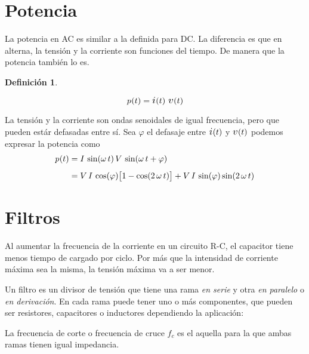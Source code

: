 \documentclass[a5paper,12pt,twoside]{book}
\newtheorem{defn}{{Definición}}[chapter]
\begin{document}
\section{Potencia}

La potencia en AC es similar a la definida para DC. La diferencia es que en alterna, la tensión y la corriente son funciones del tiempo. De manera que la potencia también lo es.

\begin{mdframed}[style=MyFrame1]
    \begin{defn}
    \end{defn}
    \begin{equation*}
        \fx{p}{t} = \fx{\current}{t} \, \fx{\voltage}{t}
    \end{equation*}
\end{mdframed}

La tensión y la corriente son ondas senoidales de igual frecuencia, pero que pueden estár defasadas entre sí. Sea $\varphi$ el defasaje entre $\fx{\current}{t}$ y $\fx{\voltage}{t}$ podemos expresar la potencia como
\begin{align*}
    p \hspace{-0.5mm} \left( t \right) &= I \, \sin (\omega \, t) \, V \, \sin (\omega \, t + \varphi)
    \\[1ex]
    &= V \, I \, \cos (\varphi) { \begin{bmatrix} 1 - \cos(2 \, \omega \, t) \end{bmatrix} } + V \, I \, \sin (\varphi) \sin (2 \, \omega \, t)
\end{align*}


\section{Filtros}

Al aumentar la frecuencia de la corriente en un circuito R-C, el capacitor tiene menos tiempo de cargado por ciclo. Por más que la intensidad de corriente máxima sea la misma, la tensión máxima va a ser menor.

Un filtro es un divisor de tensión que tiene una rama \emph{en serie} y otra \emph{en paralelo} o \emph{en derivación}. En cada rama puede tener uno o más componentes, que pueden ser resistores, capacitores o inductores dependiendo la aplicación:

\begin{center}
    \def\svgwidth{0.6\linewidth}
    
\end{center}

La frecuencia de corte o frecuencia de cruce $f_c$ es el aquella para la que ambas ramas tienen igual impedancia.
\end{document}
